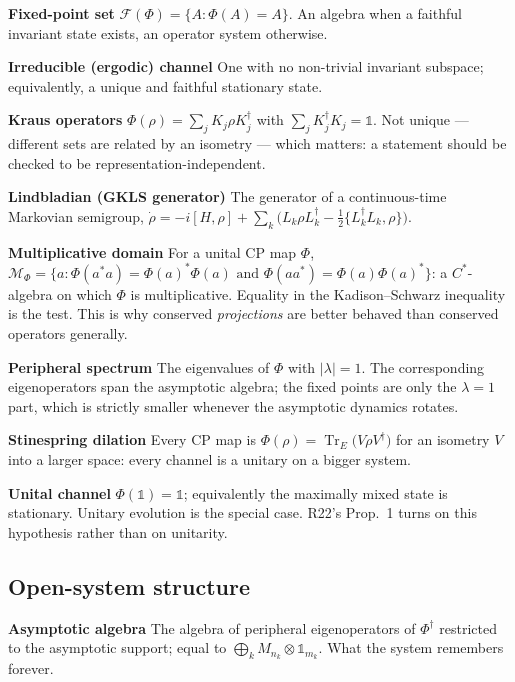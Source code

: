 \documentclass[11pt]{article}
\newcommand{\Tr}{\operatorname{Tr}}
\newcommand{\Phid}{\Phi^{\dagger}}
\newcommand{\F}{\mathcal{F}}
\newcommand{\M}{\mathcal{M}}
\newcommand{\term}[1]{\medskip\noindent\textbf{#1}\quad}
\theoremstyle{plain}
\theoremstyle{remark}
\begin{document}
\term{Fixed-point set} $\F(\Phi) = \{A : \Phi(A) = A\}$. An algebra when a
faithful invariant state exists, an operator system otherwise.
\cite{Frigerio1978, Wolf2012}

\term{Irreducible (ergodic) channel} One with no non-trivial invariant
subspace; equivalently, a unique and faithful stationary state.
\cite{CP2016, Wolf2012}

\term{Kraus operators} $\Phi(\rho) = \sum_j K_j \rho K_j^\dagger$ with
$\sum_j K_j^\dagger K_j = \mathbb{1}$. Not unique --- different sets are related
by an isometry --- which matters: a statement should be checked to be
representation-independent. \cite{Wolf2012, NC2010}

\term{Lindbladian (GKLS generator)} The generator of a continuous-time
Markovian semigroup,
$\dot\rho = -i[H,\rho] + \sum_k \big(L_k\rho L_k^\dagger -
\tfrac12\{L_k^\dagger L_k,\rho\}\big)$. \cite{BP2002, RH2012, Albert2018}

\term{Multiplicative domain} For a unital CP map $\Phi$,
$\M_\Phi = \{a : \Phi(a^*a) = \Phi(a)^*\Phi(a) \text{ and }
\Phi(aa^*) = \Phi(a)\Phi(a)^*\}$: a $C^*$-algebra on which $\Phi$ is
multiplicative. Equality in the Kadison--Schwarz inequality is the test. This is
why conserved \emph{projections} are better behaved than conserved operators
generally. \cite{Choi1974, Wolf2012}

\term{Peripheral spectrum} The eigenvalues of $\Phi$ with $|\lambda| = 1$. The
corresponding eigenoperators span the asymptotic algebra; the fixed points are
only the $\lambda = 1$ part, which is strictly smaller whenever the asymptotic
dynamics rotates. \cite{Wolf2012, Albert2018}

\term{Stinespring dilation} Every CP map is
$\Phi(\rho) = \Tr_E\!\big(V\rho V^\dagger\big)$ for an isometry $V$ into a
larger space: every channel is a unitary on a bigger system.
\cite{Wolf2012, Watrous2018}

\term{Unital channel} $\Phi(\mathbb{1}) = \mathbb{1}$; equivalently the
maximally mixed state is stationary. Unitary evolution is the special case.
R22's Prop.~1 turns on this hypothesis rather than on unitarity. \cite{Wolf2012}

\subsection{Open-system structure}

\term{Asymptotic algebra} The algebra of peripheral eigenoperators of $\Phid$
restricted to the asymptotic support; equal to
$\bigoplus_k M_{n_k}\otimes\mathbb{1}_{m_k}$. What the system remembers forever.
\cite{Albert2018, BKNPV2008}
\end{document}
